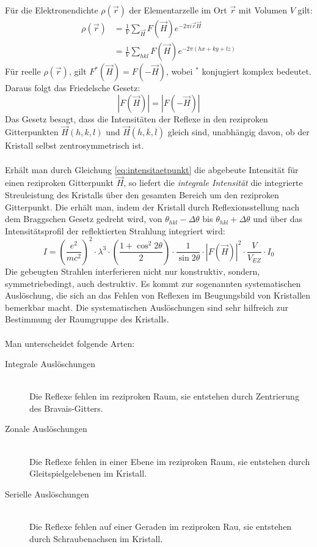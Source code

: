 \documentclass[a4paper,titlepage]{scrartcl}
\numberwithin{equation}{section}
\begin{document}
Für die Elektronendichte $\rho(\vec{r})$ der Elementarzelle im Ort $\vec{r}$ mit Volumen $V$ gilt:
\begin{align*}
\rho(\vec{r})&=\frac{1}{V} \sum_{\vec{H}} F(\vec{H}) e^{-2 \pi i \vec{r} \vec{H}}\\
&=\frac{1}{V} \sum_{hkl} F(\vec{H}) e^{-2 \pi (hx + ky + lz)}
\end{align*}
Für reelle $\rho(\vec{r})$, gilt $F^*(\vec{H})=F(-\vec{H})$, wobei $^*$ konjugiert komplex bedeutet. Daraus folgt das Friedelsche Gesetz:
\begin{equation*}
|F(\vec{H})|=|F(-\vec{H})|
\end{equation*}
Das Gesetz besagt, dass die Intensitäten der Reflexe in den reziproken Gitterpunkten $\vec{H}(h,k,l)$ und $\vec{H}(\overline{h}, \overline{k}, \overline{l})$ gleich sind, unabhängig davon, ob der Kristall selbst zentrosymmetrisch ist.\\ \\
Erhält man durch Gleichung \ref{eq:intensitaetpunkt} die abgebeute Intensität für einen reziproken Gitterpunkt $\vec{H}$, so liefert die \emph{integrale Intensität} die integrierte Streuleistung des Kristalls über den gesamten Bereich um den reziproken Gitterpunkt. Die erhält man, indem der Kristall durch Reflexionsstellung nach dem Braggschen Gesetz gedreht wird, von $\theta_{hkl} - \Delta \theta$ bis $\theta_{hkl} + \Delta \theta$ und über das Intensitätsprofil der reflektierten Strahlung integriert wird:
\begin{equation*}
I=\left( \frac{e^2}{mc^2} \right)^2 \cdot \lambda^3 \cdot \left( \frac{1+\cos^2{2 \theta}}{2} \right) \cdot \frac{1}{\sin{2 \theta}} \cdot |F(\vec{H})|^2 \cdot \frac{V}{V_{EZ}} \cdot I_0
\end{equation*}
Die gebeugten Strahlen interferieren nicht nur konstruktiv, sondern, symmetriebedingt, auch destruktiv. Es kommt zur sogenannten systematischen Auslöschung, die sich an das Fehlen von Reflexen im Beugungsbild von Kristallen bemerkbar macht. Die systematischen Auslöschungen sind sehr hilfreich zur Bestimmung der Raumgruppe des Kristalls.\\ \\
Man unterscheidet folgende Arten:
\begin{description}
\item[Integrale Auslöschungen] \hfill \\
Die Reflexe fehlen im reziproken Raum, sie entstehen durch Zentrierung des Bravais-Gitters.
\item[Zonale Auslöschungen] \hfill \\
Die Reflexe fehlen in einer Ebene im reziproken Raum, sie entstehen durch Gleitspielgelebenen im Kristall.
\item[Serielle Auslöschungen] \hfill \\
Die Reflexe fehlen auf einer Geraden im reziproken Rau, sie entstehen durch Schraubenachsen im Kristall.
\end{description}
\end{document}
